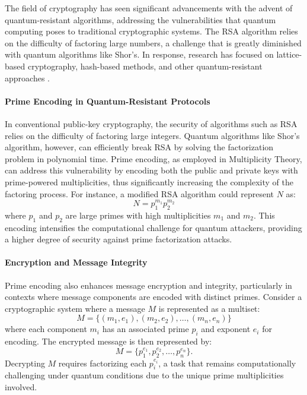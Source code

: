 \documentclass{article}
\theoremstyle{plain}
\begin{document}
The field of cryptography has seen significant advancements with the advent of quantum-resistant algorithms, addressing the vulnerabilities that quantum computing poses to traditional cryptographic systems. The RSA algorithm \cite{rivest1978} relies on the difficulty of factoring large numbers, a challenge that is greatly diminished with quantum algorithms like Shor’s. In response, research has focused on lattice-based cryptography, hash-based methods, and other quantum-resistant approaches \cite{micciancio2002}. 

\paragraph{Prime Encoding in Quantum-Resistant Protocols}

In conventional public-key cryptography, the security of algorithms such as RSA relies on the difficulty of factoring large integers. Quantum algorithms like Shor’s algorithm, however, can efficiently break RSA by solving the factorization problem in polynomial time. Prime encoding, as employed in Multiplicity Theory, can address this vulnerability by encoding both the public and private keys with prime-powered multiplicities, thus significantly increasing the complexity of the factoring process. For instance, a modified RSA algorithm could represent \( N \) as:
\begin{equation}
N = p_1^{m_1} p_2^{m_2}
\end{equation}
where \( p_1 \) and \( p_2 \) are large primes with high multiplicities \( m_1 \) and \( m_2 \). This encoding intensifies the computational challenge for quantum attackers, providing a higher degree of security against prime factorization attacks.

\paragraph{Encryption and Message Integrity}

Prime encoding also enhances message encryption and integrity, particularly in contexts where message components are encoded with distinct primes. Consider a cryptographic system where a message \( M \) is represented as a multiset:
\begin{equation}
M = \{(m_1, e_1), (m_2, e_2), \ldots, (m_n, e_n)\}
\end{equation}
where each component \( m_i \) has an associated prime \( p_i \) and exponent \( e_i \) for encoding. The encrypted message is then represented by:
\begin{equation}
M = \{p_1^{e_1}, p_2^{e_2}, \ldots, p_n^{e_n}\}.
\end{equation}
Decrypting \( M \) requires factorizing each \( p_i^{e_i} \), a task that remains computationally challenging under quantum conditions due to the unique prime multiplicities involved.
\end{document}
